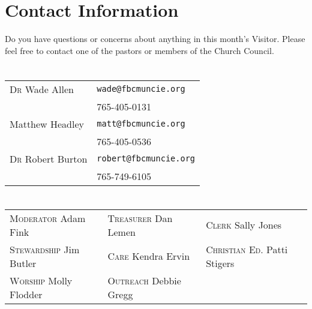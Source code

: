 \section{Contact Information}
Do you have questions or concerns about anything in this month's Visitor. Please feel free to contact one of the pastors or members of the Church Council.

\centering
\section{}
\begin{tabular}{@{}ll}
\textsc{Dr} Wade Allen & \verb|wade@fbcmuncie.org|\\ 
 & 765-405-0131\\
Matthew Headley & \verb|matt@fbcmuncie.org|\\ 
 & 765-405-0536\\
\textsc{Dr} Robert Burton & \verb|robert@fbcmuncie.org|\\
 & 765-749-6105\\
\end{tabular}

\section{}
\begin{tabular}{@{}lll}
\textsc{Moderator} Adam Fink & \textsc{Treasurer} Dan Lemen & \textsc{Clerk} Sally Jones\\
\textsc{Stewardship} Jim Butler & \textsc{Care} Kendra Ervin & \textsc{Christian Ed.} Patti Stigers\\
\textsc{Worship} Molly Flodder & \textsc{Outreach} Debbie Gregg & \\
\end{tabular}